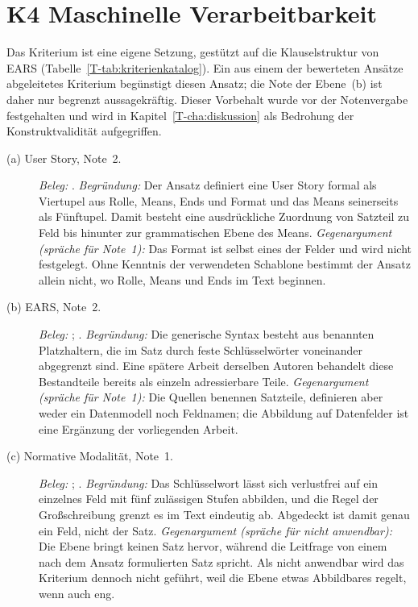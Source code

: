 \documentclass[11pt,a4paper]{report}
\begin{document}
\section{K4 Maschinelle Verarbeitbarkeit}
\label{sec:anhang-k4}

Das Kriterium ist eine eigene Setzung, gestützt auf die Klauselstruktur
von EARS (Tabelle~\ref{T-tab:kriterienkatalog}). Ein aus einem der
bewerteten Ansätze abgeleitetes Kriterium begünstigt diesen Ansatz; die
Note der Ebene~(b) ist daher nur begrenzt aussagekräftig. Dieser
Vorbehalt wurde vor der Notenvergabe festgehalten und wird in
Kapitel~\ref{T-cha:diskussion} als Bedrohung der Konstruktvalidität
aufgegriffen.

\begin{description}
  \item[(a) User Story, Note~2.]
  \emph{Beleg:} \cite[Abschn.~2 mit Abb.~1, 2.3, 3.2 und
  4.3]{lucassen2016qus}.
  \emph{Begründung:} Der Ansatz definiert eine User Story formal als
  Viertupel aus Rolle, Means, Ends und Format und das Means seinerseits
  als Fünftupel. Damit besteht eine ausdrückliche Zuordnung von Satzteil
  zu Feld bis hinunter zur grammatischen Ebene des Means.
  \emph{Gegenargument (spräche für Note~1):} Das Format ist selbst eines
  der Felder und wird nicht festgelegt. Ohne Kenntnis der verwendeten
  Schablone bestimmt der Ansatz allein nicht, wo Rolle, Means und Ends im
  Text beginnen.

  \item[(b) EARS, Note~2.]
  \emph{Beleg:} \cite[Abschn.~4.1--4.6]{mavin2009ears};
  \cite[Tab.~I]{wilkinson2018mitigation}.
  \emph{Begründung:} Die generische Syntax besteht aus benannten
  Platzhaltern, die im Satz durch feste Schlüsselwörter voneinander
  abgegrenzt sind. Eine spätere Arbeit derselben Autoren behandelt diese
  Bestandteile bereits als einzeln adressierbare Teile.
  \emph{Gegenargument (spräche für Note~1):} Die Quellen benennen
  Satzteile, definieren aber weder ein Datenmodell noch Feldnamen; die
  Abbildung auf Datenfelder ist eine Ergänzung der vorliegenden Arbeit.

  \item[(c) Normative Modalität, Note~1.]
  \emph{Beleg:} \cite[Abschn.~1--5]{rfc2119}; \cite[Abschn.~2]{rfc8174}.
  \emph{Begründung:} Das Schlüsselwort lässt sich verlustfrei auf ein
  einzelnes Feld mit fünf zulässigen Stufen abbilden, und die Regel der
  Großschreibung grenzt es im Text eindeutig ab. Abgedeckt ist damit
  genau ein Feld, nicht der Satz.
  \emph{Gegenargument (spräche für nicht anwendbar):} Die Ebene bringt
  keinen Satz hervor, während die Leitfrage von einem nach dem Ansatz
  formulierten Satz spricht. Als nicht anwendbar wird das Kriterium
  dennoch nicht geführt, weil die Ebene etwas Abbildbares regelt, wenn
  auch eng.


\end{description}
\end{document}
